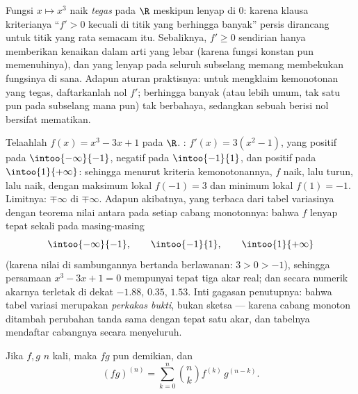 \begin{example}\label{ex:b1:derivative:strictness}
Fungsi $x \mapsto x^3$ naik \emph{tegas} pada $\R$ meskipun
 lenyap di $0$: karena klausa kriterianya
``$f' > 0$ kecuali di titik yang berhingga banyak'' persis dirancang
untuk titik yang rata semacam itu. Sebaliknya, $f' \geq 0$ sendirian hanya memberikan
kenaikan dalam arti yang lebar (karena fungsi konstan pun memenuhinya), dan
 yang lenyap pada seluruh subselang memang membekukan
fungsinya di sana. Adapun aturan praktisnya: untuk mengklaim kemonotonan
yang tegas, daftarkanlah nol $f'$; berhingga banyak (atau lebih
umum, tak satu pun pada subselang mana pun) tak berbahaya, sedangkan sebuah 
berisi nol bersifat mematikan.
\end{example}

\begin{example}\label{ex:b1:derivative:variations}
Telaahlah $f(x) = x^3 - 3x + 1$ pada $\R$. : $f'(x) =
3(x^2 - 1)$, yang positif pada $\intoo{-\infty}{-1}$, negatif pada
$\intoo{-1}{1}$, dan positif pada $\intoo{1}{+\infty}$: sehingga menurut
kriteria kemonotonannya, $f$ naik, lalu turun, lalu
naik, dengan maksimum lokal $f(-1) = 3$ dan minimum lokal
$f(1) = -1$. Limitnya: $\mp\infty$ di $\mp\infty$. Adapun akibatnya,
yang terbaca dari tabel variasinya dengan teorema nilai
antara pada setiap cabang monotonnya: bahwa $f$ lenyap tepat sekali pada
masing-masing
\[
\intoo{-\infty}{-1}, \qquad \intoo{-1}{1}, \qquad
\intoo{1}{+\infty}
\]
(karena nilai di sambungannya bertanda berlawanan: $3 > 0 > -1$),
sehingga persamaan $x^3 - 3x + 1 = 0$ mempunyai tepat tiga akar
real; dan secara numerik akarnya terletak di dekat $-1.88$, $0.35$, $1.53$. Inti
gagasan penutupnya: bahwa tabel variasi merupakan \emph{perkakas bukti},
bukan sketsa --- karena cabang monoton ditambah perubahan tanda sama dengan
tepat satu akar, dan tabelnya mendaftar cabangnya
secara menyeluruh.
\end{example}

\begin{theorem}\label{thm:b1:derivative:leibniz}
Jika $f, g$  $n$ kali, maka $fg$ pun demikian,
dan
\[
(fg)^{(n)} = \sum_{k=0}^{n} \binom nk f^{(k)}\, g^{(n-k)} .
\]
\end{theorem}

